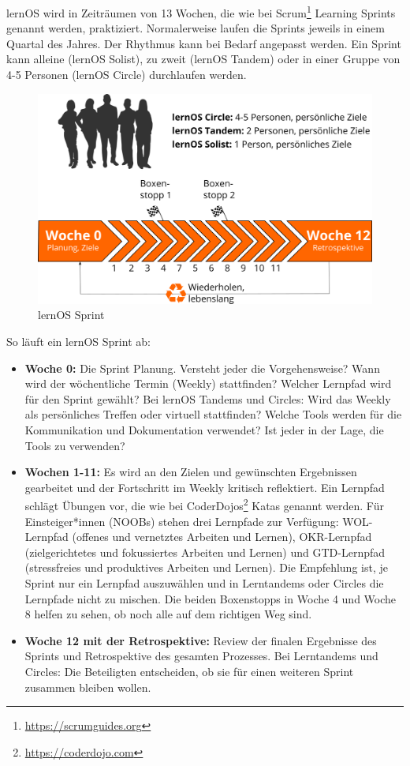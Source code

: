 \documentclass[
  ngerman,
  paper=a4,
,captions=tableheading
]{scrartcl}
\DeclareRobustCommand{\href}[2]{#2\footnote{\url{#1}}}
\providecommand{\tightlist}{%
  \setlength{\itemsep}{0pt}\setlength{\parskip}{0pt}}
\begin{document}
lernOS wird in Zeiträumen von 13 Wochen, die wie bei
\href{https://scrumguides.org}{Scrum} Learning Sprints genannt werden,
praktiziert. Normalerweise laufen die Sprints jeweils in einem Quartal
des Jahres. Der Rhythmus kann bei Bedarf angepasst werden. Ein Sprint
kann alleine (lernOS Solist), zu zweit (lernOS Tandem) oder in einer
Gruppe von 4-5 Personen (lernOS Circle) durchlaufen werden.

\begin{figure}
\centering
\includegraphics{./tex2pdf.-af94b87e0fdb9aa6/80c28d15a479ebb119ba5c36bcbcf681c76609a4.png}
\caption{lernOS Sprint}
\end{figure}

So läuft ein lernOS Sprint ab:

\begin{itemize}
\tightlist
\item
  \textbf{Woche 0:} Die Sprint Planung. Versteht jeder die
  Vorgehensweise? Wann wird der wöchentliche Termin (Weekly)
  stattfinden? Welcher Lernpfad wird für den Sprint gewählt? Bei lernOS
  Tandems und Circles: Wird das Weekly als persönliches Treffen oder
  virtuell stattfinden? Welche Tools werden für die Kommunikation und
  Dokumentation verwendet? Ist jeder in der Lage, die Tools zu
  verwenden?
\item
  \textbf{Wochen 1-11:} Es wird an den Zielen und gewünschten
  Ergebnissen gearbeitet und der Fortschritt im Weekly kritisch
  reflektiert. Ein Lernpfad schlägt Übungen vor, die wie bei
  \href{https://coderdojo.com}{CoderDojos} Katas genannt werden. Für
  Einsteiger*innen (NOOBs) stehen drei Lernpfade zur Verfügung:
  WOL-Lernpfad (offenes und vernetztes Arbeiten und Lernen),
  OKR-Lernpfad (zielgerichtetes und fokussiertes Arbeiten und Lernen)
  und GTD-Lernpfad (stressfreies und produktives Arbeiten und Lernen).
  Die Empfehlung ist, je Sprint nur ein Lernpfad auszuwählen und in
  Lerntandems oder Circles die Lernpfade nicht zu mischen. Die beiden
  Boxenstopps in Woche 4 und Woche 8 helfen zu sehen, ob noch alle auf
  dem richtigen Weg sind.
\item
  \textbf{Woche 12 mit der Retrospektive:} Review der finalen Ergebnisse
  des Sprints und Retrospektive des gesamten Prozesses. Bei Lerntandems
  und Circles: Die Beteiligten entscheiden, ob sie für einen weiteren
  Sprint zusammen bleiben wollen.
\end{itemize}
\end{document}
